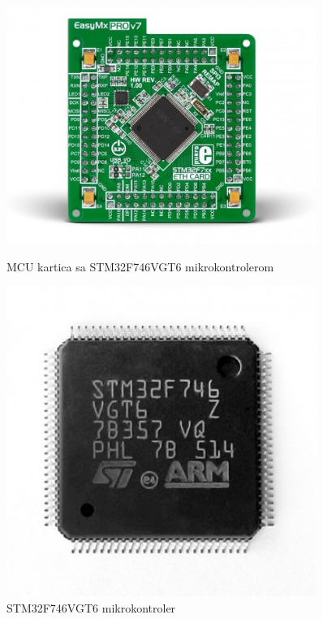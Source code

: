 \documentclass[a4paper, 12pt, oneside, titlepage]{article}
\begin{document}
      \begin{figure}[H]
	\centering
	\begin{minipage}{0.45\textwidth}
	    \centering
	    \includegraphics[width=0.9\textwidth]{slike/stm32_mcu} %
	    \caption{MCU kartica sa STM32F746VGT6 mikrokontrolerom}
	    \label{fig:stm32_mcu} %
	\end{minipage}\hfill
	\begin{minipage}{0.45\textwidth}
	    \centering
	    \includegraphics[width=0.9\textwidth]{slike/stm32} %
	    \caption{STM32F746VGT6 mikrokontroler}
	    \label{fig:stm32} %
	\end{minipage}
      \end{figure}
      
\end{document}
